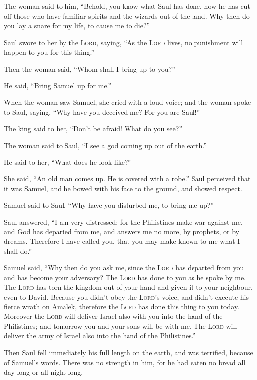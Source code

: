  The woman said to him, ``Behold, you know what Saul has
done, how he has cut off those who have familiar spirits and the wizards
out of the land. Why then do you lay a snare for my life, to cause me to
die?''

 Saul swore to her by the \textsc{Lord}, saying, ``As the
\textsc{Lord} lives, no punishment will happen to you for this thing.''

 Then the woman said, ``Whom shall I bring up to you?''

He said, ``Bring Samuel up for me.''

 When the woman saw Samuel, she cried with a loud voice;
and the woman spoke to Saul, saying, ``Why have you deceived me? For you
are Saul!''

 The king said to her, ``Don't be afraid! What do you
see?''

The woman said to Saul, ``I see a god coming up out of the earth.''

 He said to her, ``What does he look like?''

She said, ``An old man comes up. He is covered with a robe.'' Saul
perceived that it was Samuel, and he bowed with his face to the ground,
and showed respect.

 Samuel said to Saul, ``Why have you disturbed me, to
bring me up?''

Saul answered, ``I am very distressed; for the Philistines make war
against me, and God has departed from me, and answers me no more, by
prophets, or by dreams. Therefore I have called you, that you may make
known to me what I shall do.''

 Samuel said, ``Why then do you ask me, since the
\textsc{Lord} has departed from you and has become your adversary?
 The \textsc{Lord} has done to you as he spoke by me. The
\textsc{Lord} has torn the kingdom out of your hand and given it to your
neighbour, even to David.  Because you didn't obey the
\textsc{Lord}'s voice, and didn't execute his fierce wrath on Amalek,
therefore the \textsc{Lord} has done this thing to you today.
 Moreover the \textsc{Lord} will deliver Israel also with
you into the hand of the Philistines; and tomorrow you and your sons
will be with me. The \textsc{Lord} will deliver the army of Israel also
into the hand of the Philistines.''

 Then Saul fell immediately his full length on the earth,
and was terrified, because of Samuel's words. There was no strength in
him, for he had eaten no bread all day long or all night long.

